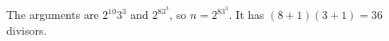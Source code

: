 The arguments are $2^{10}3^3$ and $2^83^3$, so $n=2^83^3$. It has $(8+1)(3+1)=\boxed{36}$ divisors.
